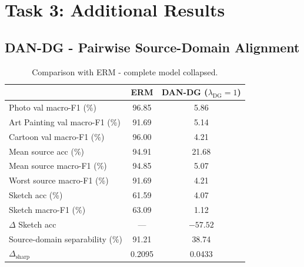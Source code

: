 \documentclass{article}
\begin{document}
\section{Task 3: Additional Results}

\subsection{DAN-DG - Pairwise Source-Domain Alignment}

\begin{table}[H]
  \caption{Comparison with ERM - complete model collapsed.}
  \label{tab:dandg}
  \centering
  \begin{tabular}{lcc}
    \toprule
    & ERM & DAN-DG ($\lambda_{\mathrm{DG}}=1$) \\
    \midrule
    Photo val macro-F1 (\%)        & 96.85 &  5.86 \\
    Art Painting val macro-F1 (\%) & 91.69 &  5.14 \\
    Cartoon val macro-F1 (\%)      & 96.00 &  4.21 \\
    \midrule
    Mean source acc (\%)           & 94.91 & 21.68 \\
    Mean source macro-F1 (\%)      & 94.85 &  5.07 \\
    Worst source macro-F1 (\%)     & 91.69 &  4.21 \\
    \midrule
    Sketch acc (\%)                & 61.59 &  4.07 \\
    Sketch macro-F1 (\%)           & 63.09 &  1.12 \\
    $\Delta$ Sketch acc            & ---   & $-57.52$ \\
    \midrule
    Source-domain separability (\%) & 91.21 & 38.74 \\
    $\Delta_{\mathrm{sharp}}$       & 0.2095 & 0.0433 \\
    \bottomrule
  \end{tabular}
\end{table}
\end{document}
